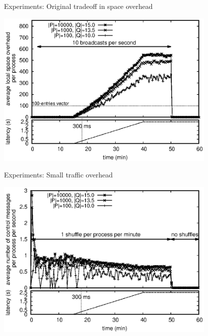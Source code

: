 \documentclass[10pt, xcolor={usenames, dvipsnames}]{beamer}
\begin{document}
\begin{frame}{Experiments: Original tradeoff in space overhead}

  \begin{center}
    \includegraphics[width=0.8\textwidth]{img/overhead.eps}
  \end{center}

\end{frame}

\begin{frame}{Experiments: Small traffic overhead}
  \begin{center}
    \includegraphics[width=0.8\textwidth]{img/controlmessages.eps}
  \end{center}
\end{frame}
\end{document}
